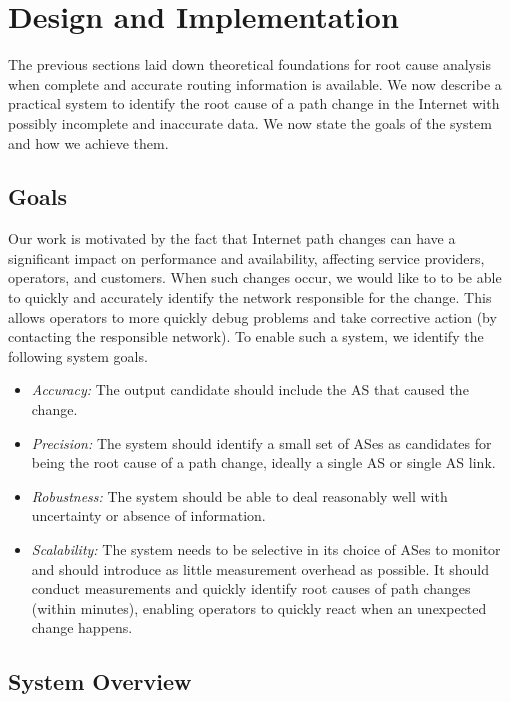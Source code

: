 \section{Design and Implementation}
\label{sec:design}

The previous sections laid down theoretical foundations for root
cause analysis when complete and accurate routing information is
available. We now describe a practical system to identify the root
cause of a path change in the Internet with possibly incomplete and
inaccurate data. We now state
the goals of the system and how we achieve them.

\subsection{Goals}

Our work is motivated by the fact that Internet path changes can 
have a significant impact on performance and availability, affecting service providers, 
operators, and customers. When such changes occur, we would like to 
to be able to quickly and accurately identify the network responsible for the 
change. This allows operators to more quickly debug problems and take 
corrective action (\eg by contacting the responsible network). To enable 
such a system, we identify the following system goals.

\begin{itemize}
%
\item \emph{Accuracy:} The output candidate should include the AS that caused the change.
%
\item \emph{Precision:} The system should identify a small set of ASes 
as candidates for being the root cause of a path change, ideally a single AS or single 
AS link. 
%
\item \emph{Robustness:} The system should be able to deal reasonably
well with uncertainty or absence of information.
%
\item \emph{Scalability:} The system needs to be selective in its choice
of ASes to monitor and should introduce as little measurement overhead
as possible. It should conduct measurements and quickly identify root causes 
of path changes (\eg within minutes), enabling operators to quickly react
when an unexpected change happens.
\end{itemize}

\subsection{System Overview}

